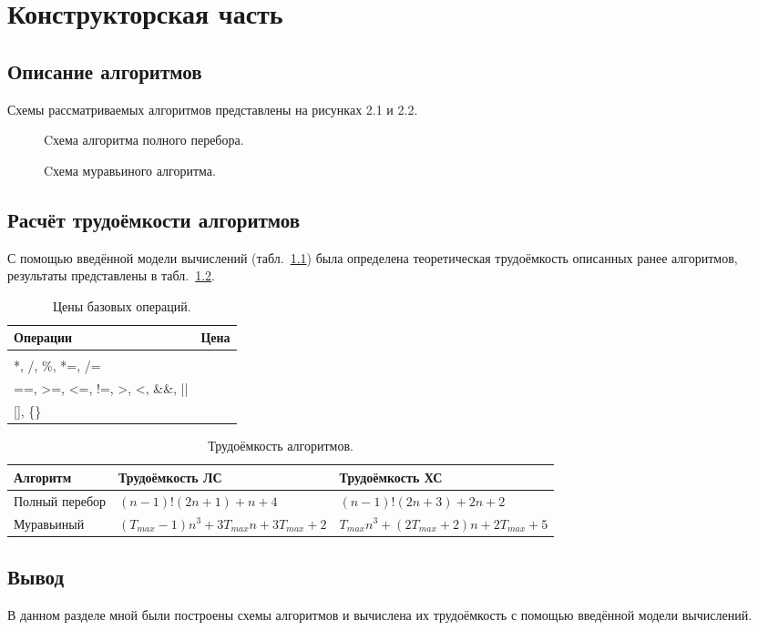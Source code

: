 \chapter{Конструкторская часть}

\section{Описание алгоритмов}

Схемы рассматриваемых алгоритмов представлены на рисунках 2.1 и 2.2.

\begin{figure}[!htbp]
	\centering
	
	\caption{Cхема алгоритма полного перебора.}
\end{figure}
\FloatBarrier

\begin{figure}[!htbp]
	\centering
	
	\caption{Cхема муравьиного алгоритма.}
\end{figure}
\FloatBarrier

\section{Расчёт трудоёмкости алгоритмов}

С помощью введённой модели вычислений (табл.~\ref{t1}) была определена теоретическая трудоёмкость описанных ранее алгоритмов, результаты представлены в табл.~\ref{t2}.

\begin{table}[!htbp]
	\caption{Цены базовых операций.}
	\label{t1}
	\centering
	\begin{tabularx}{\textwidth}{|*{2}{>{\centering\arraybackslash}X|}}
		\hline
		\textbf{Операции} & \textbf{Цена} \\\hline
		{ +, - , =, ++, $--$ , <<, >> } & 1 \\\hline
		{ *, /, \%, *=, /= } & 2 \\\hline
		{ ==, >=, <=, !=, >, <, \&\&, || } & 1 \\\hline
		{ [], \{\} } & 1\\\hline
	\end{tabularx}
\end{table}

\begin{table}[!htbp]
	\centering
	\caption{Трудоёмкость алгоритмов.}
	\label{t2}
	\small
	\begin{tabularx}{\textwidth}{|p{3cm}|*{2}{X|}}
		\hline
		\textbf{Алгоритм} & \textbf{Трудоёмкость ЛС} & \textbf{Трудоёмкость ХС} \\\hline
		Полный перебор & 
		$ (n - 1)!(2n + 1) + n + 4 $ & 
		$ (n - 1)!(2n + 3) + 2n + 2 $ \\\hline
		Муравьиный & 
		$ (T_{max} - 1)n^{3} + 3T_{max}n + 3T_{max} + 2 $ & 
		$ T_{max}n^{3} + (2T_{max} + 2)n + 2T_{max} + 5 $ \\\hline
	\end{tabularx}
\end{table}
\FloatBarrier

\section*{Вывод}

В данном разделе мной были построены схемы алгоритмов и вычислена их трудоёмкость с помощью введённой модели вычислений.

\clearpage
